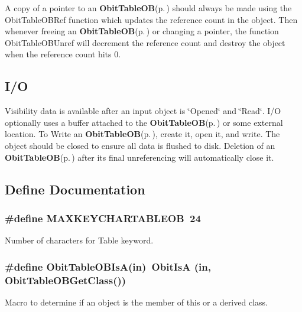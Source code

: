 A copy of a pointer to an {\bf Obit\-Table\-OB}{\rm (p.\,\pageref{structObitTableOB})} should always be made using the Obit\-Table\-OBRef function which updates the reference count in the object. Then whenever freeing an {\bf Obit\-Table\-OB}{\rm (p.\,\pageref{structObitTableOB})} or changing a pointer, the function Obit\-Table\-OBUnref will decrement the reference count and destroy the object when the reference count hits 0.\subsection{I/O}\label{ObitTableOB_8h_ObitTableOBUsage}
Visibility data is available after an input object is \char`\"{}Opened\char`\"{} and \char`\"{}Read\char`\"{}. I/O optionally uses a buffer attached to the {\bf Obit\-Table\-OB}{\rm (p.\,\pageref{structObitTableOB})} or some external location. To Write an {\bf Obit\-Table\-OB}{\rm (p.\,\pageref{structObitTableOB})}, create it, open it, and write. The object should be closed to ensure all data is flushed to disk. Deletion of an {\bf Obit\-Table\-OB}{\rm (p.\,\pageref{structObitTableOB})} after its final unreferencing will automatically close it.

\subsection{Define Documentation}
\subsubsection{\setlength{\rightskip}{0pt plus 5cm}\#define MAXKEYCHARTABLEOB\ 24}\label{ObitTableOB_8h_a0}


Number of characters for Table keyword. 

\subsubsection{\setlength{\rightskip}{0pt plus 5cm}\#define Obit\-Table\-OBIs\-A(in)\ Obit\-Is\-A (in, Obit\-Table\-OBGet\-Class())}\label{ObitTableOB_8h_a3}


Macro to determine if an object is the member of this or a derived class. 

